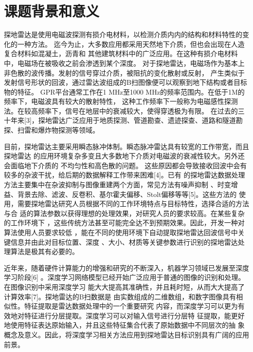\thesischapterexordium

\section{课题背景和意义}

探地雷达是使用电磁波探测有损介电材料，以检测介质内内的结构和材料特性的变化的一种方法。
迄今为止，大多数应用都采用天然地下介质，但也会出现在人造复合材料如混凝土，沥青和
其他建筑材料中的广泛应用。在这种有损介电材料中，电磁场在被吸收之前会渗透到某个深度。
对于探地雷达，电磁场作为基本上非色散的波传播。发射的信号穿过介质，被阻抗的变化散射或反射，
产生类似于发射信号形状的回波，通过雷达波组成的B扫图像便可以观察到地下结构或者目标物的特征。
GPR平台通常工作在1 MHz至1000 MHz的频率范围内。在低于1M的频率下，电磁波具有较大的散射特性，
这种工作频率下一般称为电磁感性探测法。在较高频率下，信号在地层中的衰减较大，使得穿透极为有限。
在过去的三十年来[3]，探地雷达广泛应用于地质探测、管道勘查、遗迹探查、道路和隧道勘探、扫雷和爆炸物探测等领域。

目前，探地雷达主要采用瞬态脉冲体制。瞬态脉冲雷达具有较宽的工作带宽，而且探地雷达
的应用环境复杂多变且大多数地下介质对电磁波的衰减性较大。另外还会面临地下介质的
不均匀性和高色散的问题。
这些原因都会导致接收回波中会有较多的杂波干扰，给后期的数据解释工作带来困难[4]。已有
的探地雷达数据处理方法主要集中在杂波抑制与图像重建两个方面，常见方法有噪声抑制
、时变增益、背景去除、滤波、反卷积、基尔霍夫偏移、Stolt偏移等等[5]。这些方法的
使用，需要探地雷达研究人员根据不同的工作环境特点与目标特性，选择合适的方法与合
适的算法参数以获得理想的处理效果，对研究人员的要求较高。在某些复杂的工作环境下
，这些传统方法甚至可能完全达不到预期效果。因此，开发一种对算法使用人员要求较低
，能在不同的使用环境下自动提取探地雷达回波信号中关键信息并由此对目标位置、深度
、大小、材质等关键参数进行识别的探地雷达处理算法是极其有必要的。

近年来，随着硬件计算能力的增强和研究的不断深入，机器学习领域已发展至深度学习阶段[6]
。深度学习网络模型已经开始广泛应用于普通的图像的识别和处理。在图像识别中采用深度学习
能大大提高其准确性，并且耗时短，从而大大提高了计算效率[7]。探地雷达的B扫数据是
由实数组成的二维数组，和数字图像具有相似性。特征提取是雷达数据处理中的一个重要研究
内容，而深度学习可以更为有效地对特征进行分层提取。深度学习可以对输入信号进行分层特
征提取，能更好地使用特征表达原始输入，并且这些特征集合代表了原始数据中不同层次的抽
象概念及意义。因此，将深度学习相关方法应用到探地雷达目标识别具有广阔的应用前景。

